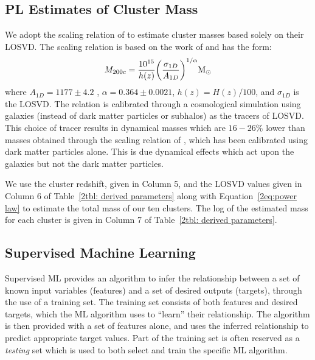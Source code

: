 \subsection{PL Estimates of Cluster Mass}
We adopt the scaling relation of \cite{Munari2013} to estimate cluster masses based solely on their LOSVD. The scaling relation is based on the work of \cite{Evrard2008} and has the form: 
\begin{equation}\label{2eq:power law}
	M_{200c} = \frac{10^{15}}{h(z)} \bigg{(}\frac{\sigma_{1D}}{A_{1D}} \bigg{)}^{1/\alpha} \hbox{$\mathrm{M}_\odot$} 
\end{equation}
where $A_{1D} =1177\pm4.2$ \kms, $\alpha = 0.364\pm0.0021$, $h(z) = H(z)/100$, and $\sigma_{1D}$ is the LOSVD. The relation is calibrated through a cosmological simulation using galaxies (instead of dark matter particles or subhalos) as the tracers of LOSVD. This choice of tracer results in dynamical masses which are $16-26\%$ lower  than masses obtained through the scaling relation of \cite{Evrard2008}, which has been calibrated using dark matter particles alone. This is due dynamical effects which act upon the galaxies but not the dark matter particles.

We use the cluster redshift, given in Column 5, and the LOSVD values given in Column 6 of Table~\ref{2tbl: derived parameters} along with Equation~\ref{2eq:power law} to estimate the total mass of our ten clusters. The log of the estimated mass for each cluster is given in Column 7 of Table~\ref{2tbl: derived parameters}.

\subsection{Supervised Machine Learning}\label{2sec:ML methods}
Supervised ML provides an algorithm to infer the relationship between a set of known input variables (features) and a set of desired outputs (targets), through the use of a training set. The training set consists of both features and desired targets, which the ML algorithm uses to ``learn'' their relationship. The algorithm is then provided with a set of features alone, and uses the inferred relationship to predict appropriate target values. Part of the training set is often reserved as a \emph{testing} set  which is used to both select and train the specific ML algorithm.

